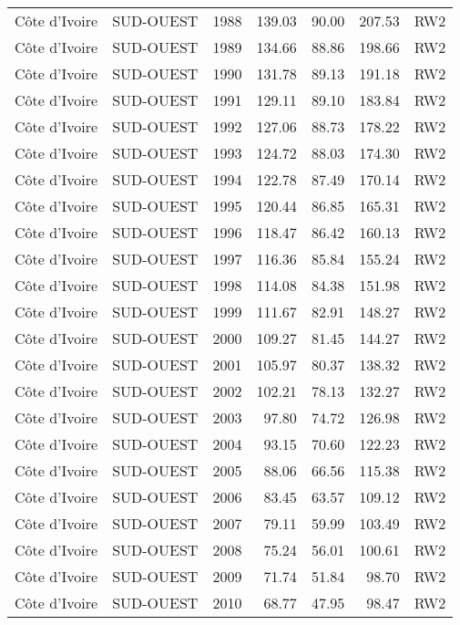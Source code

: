 \begin{longtable}{lllrrrl}
  C\^{o}te d'Ivoire & SUD-OUEST & 1988 & 139.03 & 90.00 & 207.53 & RW2 \\ 
  C\^{o}te d'Ivoire & SUD-OUEST & 1989 & 134.66 & 88.86 & 198.66 & RW2 \\ 
  C\^{o}te d'Ivoire & SUD-OUEST & 1990 & 131.78 & 89.13 & 191.18 & RW2 \\ 
  C\^{o}te d'Ivoire & SUD-OUEST & 1991 & 129.11 & 89.10 & 183.84 & RW2 \\ 
  C\^{o}te d'Ivoire & SUD-OUEST & 1992 & 127.06 & 88.73 & 178.22 & RW2 \\ 
  C\^{o}te d'Ivoire & SUD-OUEST & 1993 & 124.72 & 88.03 & 174.30 & RW2 \\ 
  C\^{o}te d'Ivoire & SUD-OUEST & 1994 & 122.78 & 87.49 & 170.14 & RW2 \\ 
  C\^{o}te d'Ivoire & SUD-OUEST & 1995 & 120.44 & 86.85 & 165.31 & RW2 \\ 
  C\^{o}te d'Ivoire & SUD-OUEST & 1996 & 118.47 & 86.42 & 160.13 & RW2 \\ 
  C\^{o}te d'Ivoire & SUD-OUEST & 1997 & 116.36 & 85.84 & 155.24 & RW2 \\ 
  C\^{o}te d'Ivoire & SUD-OUEST & 1998 & 114.08 & 84.38 & 151.98 & RW2 \\ 
  C\^{o}te d'Ivoire & SUD-OUEST & 1999 & 111.67 & 82.91 & 148.27 & RW2 \\ 
  C\^{o}te d'Ivoire & SUD-OUEST & 2000 & 109.27 & 81.45 & 144.27 & RW2 \\ 
  C\^{o}te d'Ivoire & SUD-OUEST & 2001 & 105.97 & 80.37 & 138.32 & RW2 \\ 
  C\^{o}te d'Ivoire & SUD-OUEST & 2002 & 102.21 & 78.13 & 132.27 & RW2 \\ 
  C\^{o}te d'Ivoire & SUD-OUEST & 2003 & 97.80 & 74.72 & 126.98 & RW2 \\ 
  C\^{o}te d'Ivoire & SUD-OUEST & 2004 & 93.15 & 70.60 & 122.23 & RW2 \\ 
  C\^{o}te d'Ivoire & SUD-OUEST & 2005 & 88.06 & 66.56 & 115.38 & RW2 \\ 
  C\^{o}te d'Ivoire & SUD-OUEST & 2006 & 83.45 & 63.57 & 109.12 & RW2 \\ 
  C\^{o}te d'Ivoire & SUD-OUEST & 2007 & 79.11 & 59.99 & 103.49 & RW2 \\ 
  C\^{o}te d'Ivoire & SUD-OUEST & 2008 & 75.24 & 56.01 & 100.61 & RW2 \\ 
  C\^{o}te d'Ivoire & SUD-OUEST & 2009 & 71.74 & 51.84 & 98.70 & RW2 \\ 
  C\^{o}te d'Ivoire & SUD-OUEST & 2010 & 68.77 & 47.95 & 98.47 & RW2 \\ 

\end{longtable}
